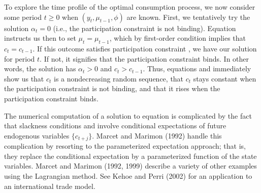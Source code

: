 To explore the time profile of the optimal consumption process, we now
consider some period $t\geq 0$ when $(y_t, \mu_{t-1},\phi)$ are known.
 First, we tentatively try the solution $\alpha_t=0$ (i.e., the participation
constraint is not binding).  Equation  instructs us then to
set $\mu_t = \mu_{t-1}$, which by first-order condition 
implies that $c_t = c_{t-1}$. If this outcome satisfies participation
constraint , we have our solution for period $t$. If not,
it signifies that the participation constraint binds. In other words,
the solution has $\alpha_t>0$ and $c_t>c_{t-1}$. Thus,
equations  and  immediately show us that $c_t$
is a nondecreasing random sequence, that $c_t$ stays
constant when the participation constraint is not binding,
and that it rises when the participation constraint binds.

The numerical computation of a solution to equation 
is complicated by the fact that slackness conditions 
and  involve conditional expectations
of future endogenous variables $\{c_{t+j}\}$. Marcet and
Marimon (1992) handle this complication by resorting to the
parameterized expectation approach; that is, they replace
the conditional expectation by a parameterized function of
the state variables.
  Marcet and Marimon (1992, 1999) %
describe a variety of other examples using the Lagrangian method.
See Kehoe and Perri (2002)
%
for an application to an international trade  model.
%
%



